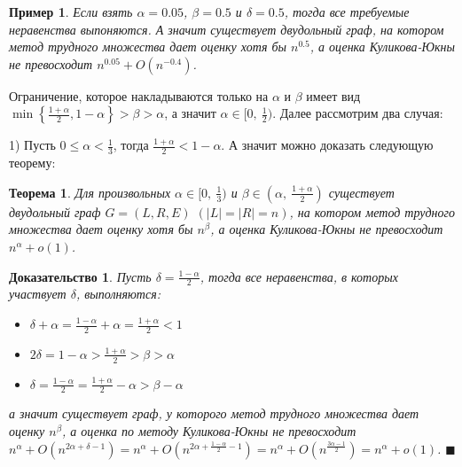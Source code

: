 \documentclass[a4paper]{article}
\newtheorem{mtheorem}{Теорема}[section]
\newtheorem*{msolution}{Доказательство}
\newtheorem*{mexample}{Пример}
\begin{document}
\begin{mexample}
    Если взять $\alpha = 0.05$, $\beta = 0.5$ и $\delta = 0.5$, тогда все требуемые неравенства выпоняются.
    А значит существует двудольный граф, на котором метод трудного множества дает оценку хотя бы $n^{0.5}$, а  
    оценка Куликова-Юкны не превосходит $n^{0.05} + O(n^{-0.4})$.
\end{mexample}


Ограничение, которое накладываются только на $\alpha$ и $\beta$ имеет вид $\min\left\{\frac{1+\alpha}{2},
1-\alpha\right\} > \beta > \alpha$, а значит $\alpha \in [0,\ \frac{1}{2})$. Далее рассмотрим два случая:

1) Пусть $0 \leq \alpha < \frac{1}{3}$, тогда $\frac{1+\alpha}{2} < 1 - \alpha$. А значит 
можно доказать следующую теорему:
\begin{mtheorem}
	Для произвольных $\alpha \in [0,\ \frac{1}{3})$ и $\beta \in (\alpha,\ \frac{1+\alpha}{2})$ существует 
	двудольный граф $G = (L, R, E)$ $(|L| = |R| = n)$, на котором метод трудного множества 
	дает оценку хотя бы $n^\beta$, а оценка Куликова-Юкны не превосходит $n^\alpha + o(1)$.
\end{mtheorem}
\begin{msolution}
	Пусть $\delta = \frac{1-\alpha}{2}$, тогда все неравенства, в которых участвует $\delta$, выполняются:
	\begin{itemize}[noitemsep]
		\item $\delta + \alpha = \frac{1-\alpha}{2} + \alpha = \frac{1+\alpha}{2} < 1$
		\item $2\delta = 1 - \alpha > \frac{1+\alpha}{2} > \beta > \alpha$
		\item $\delta = \frac{1-\alpha}{2} = \frac{1+\alpha}{2} - \alpha > \beta - \alpha$
	\end{itemize}
	а значит существует граф, у которого метод трудного множества дает оценку $n^{\beta}$, 
	а оценка по методу Куликова-Юкны не превосходит $n^\alpha + O(n^{2\alpha + \delta - 1}) = 
	n^\alpha + O(n^{2\alpha + \frac{1-\alpha}{2} - 1}) = n^{\alpha} + O(n^{\frac{3\alpha - 1}{2}}) = n^{\alpha} + o(1)$. $\blacksquare$
\end{msolution}
\end{document}
